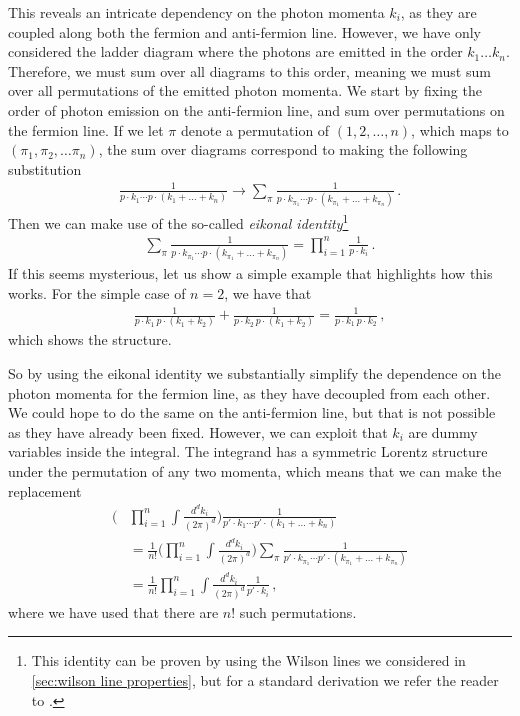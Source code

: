 This reveals an intricate dependency on the photon momenta $k_i$, as they are coupled along both the fermion and anti-fermion line. However, we have only considered the ladder diagram where the photons are emitted in the order $k_1\dots k_n$. Therefore, we must sum over all diagrams to this order, meaning we must sum over all permutations of the emitted photon momenta. We start by fixing the order of photon emission on the anti-fermion line, and sum over permutations on the fermion line. If we let $\pi$ denote a permutation of $(1,2,\dots,n)$, which maps to $(\pi_1,\pi_2,\dots \pi_n)$, the sum over diagrams correspond to making the following substitution
\begin{align*}
    \frac{1}{p\cdot k_1\cdots p\cdot(k_1+\dots +k_n)}\rightarrow \sum_{\pi}\frac{1}{p\cdot k_{\pi_1}\cdots p\cdot(k_{\pi_1}+\dots +k_{\pi_n})}\,.
\end{align*}
Then we can make use of the so-called \emph{eikonal identity}\footnote{This identity can be proven by using the Wilson lines we considered in \cref{sec:wilson line properties}, but for a standard derivation we refer the reader to \cite{Peskin:257493}.}
\begin{align}
    \sum_{\pi}\frac{1}{p\cdot k_{\pi_1}\cdots p\cdot(k_{\pi_1}+\dots +k_{\pi_n})}=\prod_{i=1}^{n}\frac{1}{p\cdot k_i}\,.
\end{align}
If this seems mysterious, let us show a simple example that highlights how this works. For the simple case of $n=2$, we have that
\begin{align}
    \frac{1}{p\cdot k_1\,p\cdot(k_1+k_2)}+\frac{1}{p\cdot k_2\,p\cdot(k_1+k_2)}=\frac{1}{p\cdot k_1\,p\cdot k_2}\,,
\end{align}
which shows the structure.

So by using the eikonal identity we substantially simplify the dependence on the photon momenta for the fermion line, as they have decoupled from each other. We could hope to do the same on the anti-fermion line, but that is not possible as they have already been fixed. However, we can exploit that $k_i$ are dummy variables inside the integral. The integrand has a symmetric Lorentz structure under the permutation of any two momenta, which means that we can make the replacement
\begin{align}
    \Big(&\prod_{i=1}^{n}\int\frac{d^{d}k_i}{(2\pi)^{d}}\Big)\frac{1}{p'\cdot k_1\cdots p'\cdot(k_1+\dots +k_n)}\nonumber
    \\
    &=\frac{1}{n!}\Big(\prod_{i=1}^{n}\int\frac{d^{d}k_i}{(2\pi)^{d}}\Big)\sum_{\pi}\frac{1}{p'\cdot k_{\pi_1}\cdots p'\cdot(k_{\pi_1}+\dots +k_{\pi_n})}\nonumber
    \\
    &=\frac{1}{n!}\prod_{i=1}^{n}\int\frac{d^{d}k_i}{(2\pi)^{d}}\frac{1}{p'\cdot k_i}\,,
\end{align}
where we have used that there are $n!$ such permutations. 

